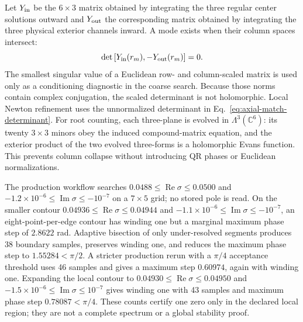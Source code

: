 Let $Y_{\rm in}$ be the $6\times3$ matrix obtained by integrating the three
regular center solutions outward and $Y_{\rm out}$ the corresponding matrix
obtained by integrating the three physical exterior channels inward.  A mode
exists when their column spaces intersect:
\begin{equation}
\det\left[Y_{\rm in}(r_m),-Y_{\rm out}(r_m)\right]=0.
\label{eq:axial-match-determinant}
\end{equation}
The smallest singular value of a Euclidean row- and column-scaled matrix is
used only as a conditioning diagnostic in the coarse search. Because those
norms contain complex conjugation, the scaled determinant is not holomorphic.
Local Newton refinement uses the unnormalized determinant in
Eq.~\eqref{eq:axial-match-determinant}. For root counting, each three-plane is
evolved in $\Lambda^3(\mathbb C^6)$: its twenty $3\times3$ minors obey the
induced compound-matrix equation, and the exterior product of the two evolved
three-forms is a holomorphic Evans function. This prevents column collapse
without introducing QR phases or Euclidean normalizations.

The production workflow searches
$0.0488\leq\operatorname{Re}\sigma\leq0.0500$ and
$-1.2\times10^{-6}\leq\operatorname{Im}\sigma\leq-10^{-7}$ on a $7\times5$
grid; no stored pole is read.  On the smaller contour
$0.04936\leq\operatorname{Re}\sigma\leq0.04944$ and
$-1.1\times10^{-6}\leq\operatorname{Im}\sigma\leq-10^{-7}$, an
eight-point-per-edge contour has winding one but a marginal maximum phase step
of $2.8622$ rad. Adaptive bisection of only under-resolved segments produces
38 boundary samples, preserves winding one, and reduces the maximum phase step
to $1.55284<\pi/2$. A stricter production rerun with a $\pi/4$ acceptance
threshold uses 46 samples and gives a maximum step $0.60974$, again with
winding one. Expanding the local contour to
$0.04930\leq\operatorname{Re}\sigma\leq0.04950$ and
$-1.5\times10^{-6}\leq\operatorname{Im}\sigma\leq10^{-7}$ gives winding one
with 43 samples and maximum phase step $0.78087<\pi/4$. These counts certify
one zero only in the declared local region; they are not a complete spectrum
or a global stability proof.

